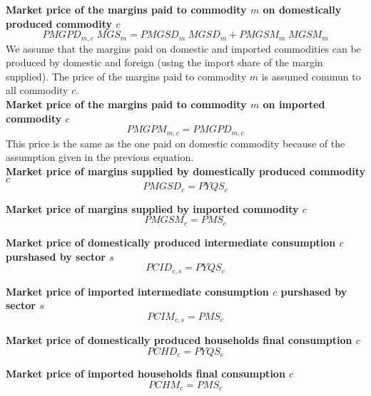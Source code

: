 \documentclass[12pt]{article}
\numberwithin{equation}{section}
\begin{document}
\noindent \textbf{Market price of the margins paid to commodity $m$ on domestically produced commodity $c$} 
\begin{dmath}
PMGPD_{m, c} \; MGS_{m} = PMGSD_{m} \; MGSD_{m} + PMGSM_{m} \; MGSM_{m}
\label{prices.mdlPMGPD[m, c]}
\end{dmath}
We assume that the margins paid on domestic and imported commodities can be produced by domestic and foreign (using the import share of the margin supplied). The price of the margins paid to commodity $m$ is assumed commun to all commodity $c$. \\

\noindent \textbf{Market price of the margins paid to commodity $m$ on imported commodity $c$} 
\begin{dmath}
PMGPM_{m, c} = PMGPD_{m, c}
\label{prices.mdlPMGPM[m, c]}
\end{dmath}
This price is the same as the one paid on domestic commodity because of the assumption given in the previous equation. \\

\noindent \textbf{Market price of margins supplied by domestically produced commodity $c$} 
\begin{dmath}
PMGSD_{c} = PYQS_{c}
\label{prices.mdlPMGSD[c]}
\end{dmath}

\noindent \textbf{Market price of margins supplied by imported commodity $c$} 
\begin{dmath}
PMGSM_{c} = PMS_{c}
\label{prices.mdlPMGSM[c]}
\end{dmath}

\noindent \textbf{Market price of domestically produced intermediate consumption $c$ purshased by sector $s$} 
\begin{dmath}
PCID_{c, s} = PYQS_{c}
\label{prices.mdlPCID[c, s]}
\end{dmath}

\noindent \textbf{Market price of imported intermediate consumption $c$ purshased by sector $s$} 
\begin{dmath}
PCIM_{c, s} = PMS_{c}
\label{prices.mdlPCIM[c, s]}
\end{dmath}

\noindent \textbf{Market price of domestically produced households final consumption $c$} 
\begin{dmath}
PCHD_{c} = PYQS_{c}
\label{prices.mdlPCHD[c]}
\end{dmath}

\noindent \textbf{Market price of imported households final consumption $c$} 
\begin{dmath}
PCHM_{c} = PMS_{c}
\label{prices.mdlPCHM[c]}
\end{dmath}
\end{document}

